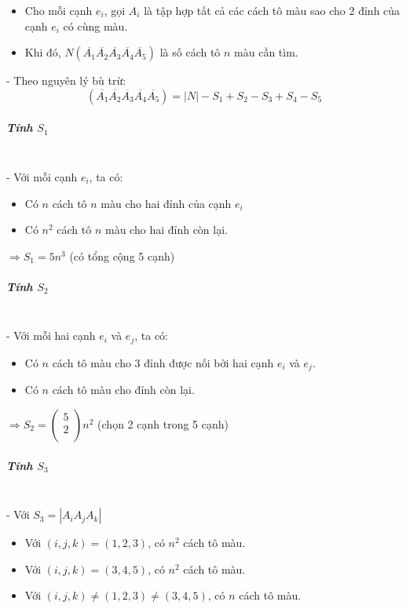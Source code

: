 \documentclass[12pt]{article}
\begin{document}
\begin{sloppypar}
\begin{itemize}
    \item Cho mỗi cạnh \(e_{i}\), gọi \(A_{i}\) là tập hợp tất cả các cách tô màu sao cho 2 đỉnh của cạnh \(e_{i}\) có cùng màu.
    \item Khi đó, \(N(\overline{A_{1}}\overline{A_{2}}\overline{A_{3}}\overline{A_{4}}\overline{A_{5}})\) là số cách tô \(n\) màu cần tìm.
\end{itemize}

- Theo nguyên lý bù trừ:
\begin{equation*}
    (\overline{A_{1}}\overline{A_{2}}\overline{A_{3}}\overline{A_{4}}\overline{A_{5}}) = |N| - S_{1} + S_{2} - S_{3} + S_{4} - S_{5}
\end{equation*}

\subparagraph{Tính \(S_{1}\)}\mbox{}\\

- Với mỗi cạnh \(e_{i}\), ta có:

\begin{itemize}
    \item Có \(n\) cách tô \(n\) màu cho hai đỉnh của cạnh \(e_{i}\)
    \item Có \(n^{2}\) cách tô \(n\) màu cho hai đỉnh còn lại.
\end{itemize}

\(\Rightarrow S_{1} = 5n^{3}\) (có tổng cộng 5 cạnh) 

\subparagraph{Tính \(S_{2}\)}\mbox{}\\

- Với mỗi hai cạnh \(e_{i}\) và \(e_{j}\), ta có:
\begin{itemize}
    \item Có \(n\) cách tô màu cho 3 đỉnh được nối bởi hai cạnh \(e_{i}\) và \(e_{j}\).
    \item Có \(n\) cách tô màu cho đỉnh còn lại.
\end{itemize}

\(\Rightarrow S_{2} =  \begin{pmatrix} 5 \\ 2 \\ \end{pmatrix}n^{2}\) (chọn 2 cạnh trong 5 cạnh) 


\subparagraph{Tính \(S_{3}\)}\mbox{}\\

- Với \(S_{3} = |A_{i}A_{j}{A_{k}}|\)
\begin{itemize}
    \item Với \((i,j,k) = (1,2,3)\), có \(n^{2}\) cách tô màu.
    \item Với \((i,j,k) = (3,4,5)\), có \(n^{2}\) cách tô màu.
    \item Với \((i,j,k) \neq (1,2,3) \neq (3,4,5)\), có \(n\) cách tô màu.
\end{itemize}


\end{sloppypar}
\end{document}
